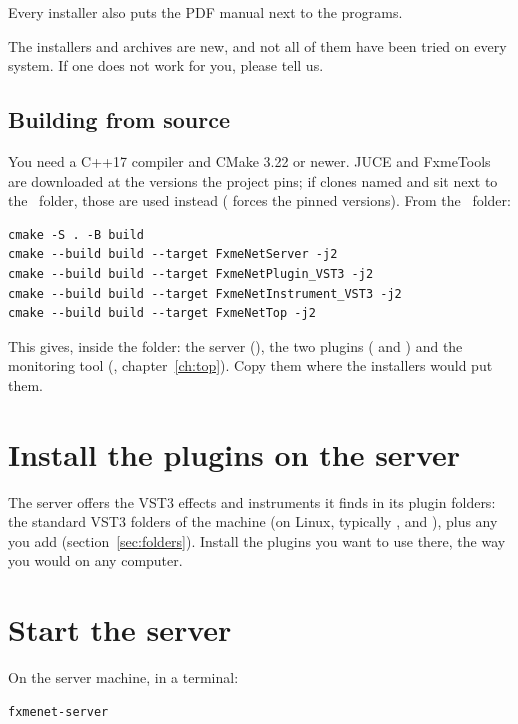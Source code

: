 Every installer also puts the PDF manual next to the programs.

\begin{note}
The installers and archives are new, and not all of them have been tried on
every system. If one does not work for you, please tell us.
\end{note}

\subsection{Building from source}

You need a C++17 compiler and CMake 3.22 or newer. JUCE and FxmeTools are
downloaded at the versions the project pins; if clones named  and
 sit next to the \fxme\ folder, those are used instead
( forces the pinned versions). From the \fxme\
folder:

\begin{lstlisting}
cmake -S . -B build
cmake --build build --target FxmeNetServer -j2
cmake --build build --target FxmeNetPlugin_VST3 -j2
cmake --build build --target FxmeNetInstrument_VST3 -j2
cmake --build build --target FxmeNetTop -j2
\end{lstlisting}

This gives, inside the  folder: the server
(), the two plugins ( and
\file{FxmeNet Instrument.vst3}) and the monitoring
tool (, chapter~\ref{ch:top}). Copy them where the
installers would put them.

\section{Install the plugins on the server}

The server offers the VST3 effects and instruments it finds in its plugin folders: the
standard VST3 folders of the machine (on Linux, typically
,  and
), plus any you add (section~\ref{sec:folders}).
Install the plugins you want to use there, the way you would on any computer.

\section{Start the server}

On the server machine, in a terminal:

\begin{lstlisting}
fxmenet-server
\end{lstlisting}

